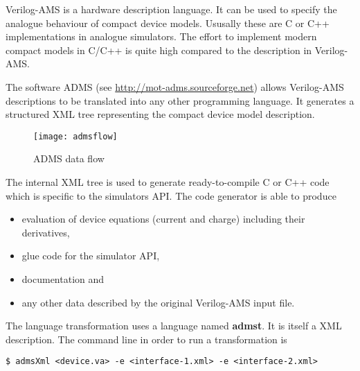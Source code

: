 %
%
%
%


Verilog-AMS is a hardware description language.  It can be used to
specify the analogue behaviour of compact device models.  Ususally
these are C or C++ implementations in analogue simulators.  The effort
to implement modern compact models in C/C++ is quite high compared to
the description in Verilog-AMS.


The software ADMS (see \url{http://mot-adms.sourceforge.net}) allows
Verilog-AMS descriptions to be translated into any other programming
language.  It generates a structured XML tree representing the compact
device model description.

\begin{figure}[ht]
\begin{center}
\texttt{[image: admsflow]}
\end{center}
\caption{ADMS data flow}
\label{fig:admsflow}
\end{figure}
\FloatBarrier

The internal XML tree is used to generate ready-to-compile C or C++
code which is specific to the simulators API.  The code generator is
able to produce
\begin{itemize}
\item evaluation of device equations (current and charge) including
their derivatives,
\item glue code for the simulator API,
\item documentation and
\item any other data described by the original Verilog-AMS input file.
\end{itemize}


The language transformation uses a language named \textbf{admst}.  It
is itself a XML description.  The command line in order to run a
transformation is
\begin{Verbatim}[fontsize=\small]
  $ admsXml <device.va> -e <interface-1.xml> -e <interface-2.xml>
\end{Verbatim}

